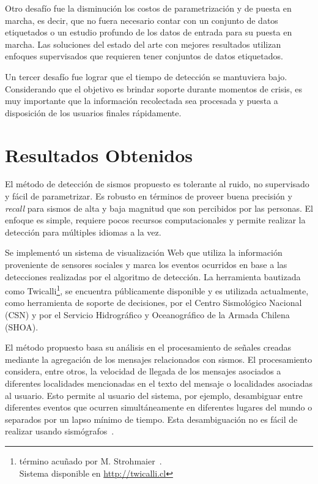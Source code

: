 Otro desafío fue la disminución los costos de parametrización y de puesta en marcha, es decir, que no fuera necesario contar con un conjunto de datos etiquetados o un estudio profundo de los datos de entrada para su puesta en marcha.
%
Las soluciones del estado del arte con mejores resultados utilizan enfoques supervisados que requieren tener conjuntos de datos etiquetados. 


Un tercer desafío fue lograr que el tiempo de detección se mantuviera bajo. Considerando que el objetivo es brindar soporte durante momentos de crisis, es muy importante que la información recolectada sea procesada y puesta a disposición de los usuarios finales rápidamente.


\section{Resultados Obtenidos}

El método de detección de sismos propuesto es tolerante al ruido, no supervisado y fácil de parametrizar. 
%
Es robusto en términos de proveer buena precisión y {\em recall} para sismos de alta y baja magnitud que son percibidos por las personas.
%
El enfoque es simple, requiere pocos recursos computacionales y permite realizar la detección para múltiples idiomas a la vez.


Se implementó un sistema de visualización Web que utiliza la información proveniente de sensores sociales y marca los eventos ocurridos en base a las detecciones realizadas por el algoritmo de detección. 
%
La herramienta bautizada como Twicalli\footnote{término acuñado por M. Strohmaier~\cite{Strohmaier2010Twicalli}.\\Sistema disponible en \url{http://twicalli.cl}}, 
se encuentra públicamente disponible y es utilizada actualmente, como herramienta de soporte de decisiones, por el Centro Sismológico Nacional (CSN) y por el Servicio Hidrográfico y Oceanográfico de la Armada Chilena (SHOA).


El método propuesto basa su análisis en el procesamiento de señales creadas mediante la agregación de los mensajes relacionados con sismos. 
%
El procesamiento considera, entre otros, la velocidad de llegada de los mensajes asociados a diferentes localidades mencionadas en el texto del mensaje o localidades asociadas al usuario.
%
Esto permite al usuario del sistema, por ejemplo, desambiguar entre diferentes eventos que ocurren simultáneamente en diferentes lugares del mundo o separados por un lapso mínimo de tiempo.
%
Esta desambiguación no es fácil de realizar usando sismógrafos~\cite{kennett1991traveltimes,sambridge2001seismic}.


